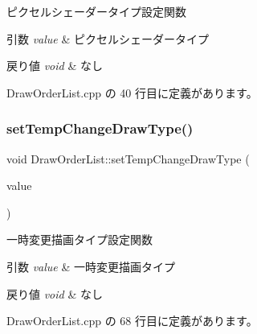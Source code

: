 ピクセルシェーダータイプ設定関数 


\begin{DoxyParams}{引数}
{\em value} & ピクセルシェーダータイプ \\
\hline
\end{DoxyParams}

\begin{DoxyRetVals}{戻り値}
{\em void} & なし \\
\hline
\end{DoxyRetVals}


 Draw\+Order\+List.\+cpp の 40 行目に定義があります。

\mbox{\label{class_draw_order_list_a4e4126b1de6ba16ce30558b9e8d9b490}} 
\subsubsection{\texorpdfstring{set\+Temp\+Change\+Draw\+Type()}{setTempChangeDrawType()}}
{\footnotesize\ttfamily void Draw\+Order\+List\+::set\+Temp\+Change\+Draw\+Type (\begin{DoxyParamCaption}\item[{\mbox{\hyperlink{class_draw_order_list_a6c9b9ceb312c16d399ef355f4f3486bb}{Draw\+Order\+List\+::\+Draw\+Type}}}]{value }\end{DoxyParamCaption})}



一時変更描画タイプ設定関数 


\begin{DoxyParams}{引数}
{\em value} & 一時変更描画タイプ \\
\hline
\end{DoxyParams}

\begin{DoxyRetVals}{戻り値}
{\em void} & なし \\
\hline
\end{DoxyRetVals}


 Draw\+Order\+List.\+cpp の 68 行目に定義があります。

\mbox{\label{class_draw_order_list_ad813fde8368b6e8ae6ba373edd0a0a42}} 
